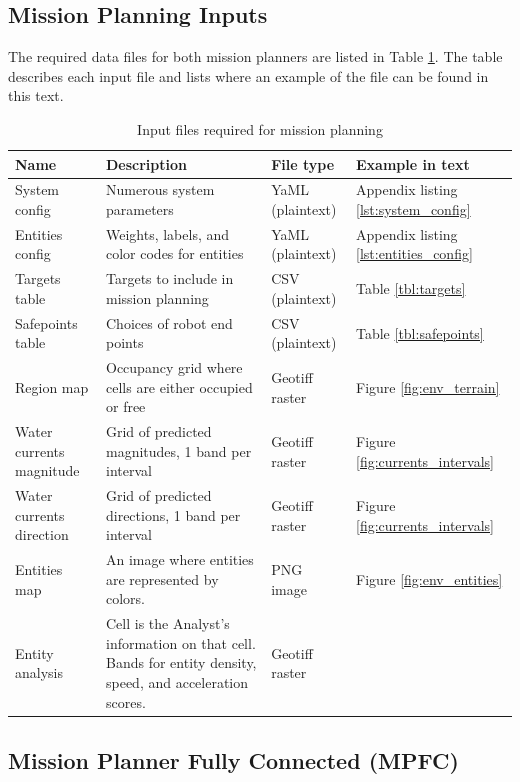 \documentclass{tamuccthesis}
\begin{document}
\subsection{Mission Planning Inputs}

The required data files for both mission planners are listed in Table \ref{tbl:planner_input}. The table describes each input file and lists where an example of the file can be found in this text. 


\begin{table}[H]\small
\begin{tabular}{|p{2.75cm}|p{5cm}|l|l|}
\hline
Name & Description & File type & Example in text \\
\hline
System config    & Numerous system parameters  & YaML (plaintext) & Appendix listing \ref{lst:system_config} \\
\hline
Entities config  & Weights, labels, and color codes for entities  & YaML (plaintext) & Appendix listing \ref{lst:entities_config}  \\
\hline
Targets table    & Targets to include in mission planning & CSV (plaintext)  & Table \ref{tbl:targets} \\
\hline
Safepoints table & Choices of robot end points & CSV (plaintext)  & Table \ref{tbl:safepoints} \\
\hline
Region map       & Occupancy grid where cells are either occupied or free  & Geotiff raster & Figure \ref{fig:env_terrain} \\
\hline
Water currents magnitude & Grid of predicted magnitudes, 1 band per interval  & Geotiff raster & Figure \ref{fig:currents_intervals} \\
\hline
Water currents direction & Grid of predicted directions, 1 band per interval & Geotiff raster & Figure \ref{fig:currents_intervals} \\
\hline
Entities map & An image where entities are represented by colors. & PNG image & Figure \ref{fig:env_entities} \\
\hline
Entity analysis  & Cell is the Analyst's information on that cell. Bands for entity density, speed, and acceleration scores. & Geotiff raster  &  \\ 
\hline
\end{tabular}
\caption{Input files required for mission planning}
\label{tbl:planner_input}

\end{table}


\subsection{Mission Planner Fully Connected (MPFC)}
\end{document}
